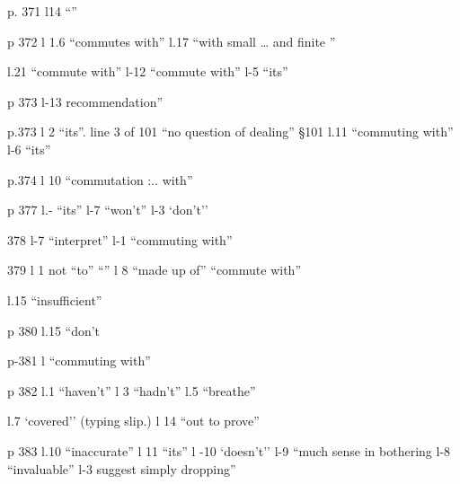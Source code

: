 

p. 371 l14 ``''

p 372 l 1.6 ``commutes with'' \quad l.17 ``with small \ldots{} and finite ''

l.21 ``commute with'' \quad l-12 ``commute with'' \quad l-5 ``its''

p 373 l-13 recommendation''

p.373 l 2 ``its''. \quad line 3 of 101 ``no question of dealing'' \quad \S101 l.11 ``commuting with'' \quad l-6 ``its''

p.374 l 10 ``commutation :.. with''

p 377 l.- ``its'' \quad l-7 ``won't'' \quad l-3 `don't'' 

378 l-7 ``interpret'' \quad l-1 ``commuting with''

379 l 1 not ``to'' ``'' \quad l 8 ``made up of'' \quad ``commute with''

l.15 ``insufficient''

p 380 l.15 ``don't

p-381 l ``commuting with''

p 382 l.1 ``haven't'' \quad l 3 ``hadn't'' \quad l.5 ``breathe''

l.7 `covered'' (typing slip.) \quad l 14 ``out to prove''

p 383 l.10 ``inaccurate'' \quad l 11 ``its'' \quad l -10 `doesn't'' \quad l-9 ``much sense in bothering \quad l-8 ``invaluable'' \quad l-3 suggest simply dropping''

